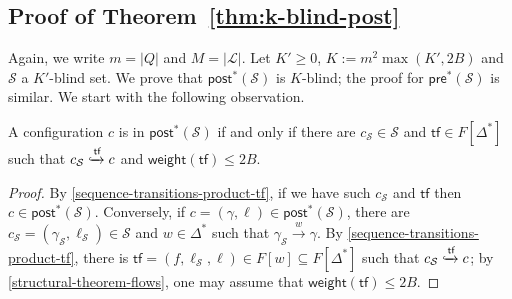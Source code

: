 \documentclass[10pt,a4paper]{article}
\renewcommand{\geq}{\geqslant}
\renewcommand{\leq}{\leqslant}
\newcommand{\deff}{:=}
\newcommand{\size}[1]{|#1|}
\newcommand{\config}{\gamma}
\newcommand{\preop}{\mathsf{pre}}
\newcommand{\postop}{\mathsf{post}}
\newcommand{\prestar}[1]{\preop^*(#1)}
\newcommand{\poststar}[1]{\postop^*(#1)}
\newcommand{\step}[1]{\xrightarrow{#1}}
\newcommand{\transitions}{\Delta}
\newcommand*{\states}{Q}
\newcommand{\cSet}{\mathcal{S}}  %
\newcommand{\bstates}{\mathcal{L}}
\newcommand*{\abuchistate}{\ell}
\newcommand*{\bstate}{\abuchistate}
\newcommand{\prodconfig}{c}
\newcommand*{\tfweight}[1]{\mathsf{weight}(#1)}
\newcommand*{\transfersof}[1]{F[#1]}
\newcommand*{\atf}{\mathsf{tf}}
\newcommand*{\flowstep}[1]{\xhookrightarrow{#1}}
\begin{document}
%
\subsection{Proof of Theorem~\ref{thm:k-blind-post}}

%
Again, we write \(m = \size{\states}\) and \(M = \size{\bstates}\).
Let \(K' \geq 0\), \(K \deff m^2 \max(K', 2 B)\) and \(\cSet\) a \(K'\)-blind set.
We prove that \(\poststar{\cSet}\) is \(K\)-blind; the proof for \(\prestar{\cSet}\) is similar.
We start with the following observation.

\begin{lemma}
	\label{poststar-chacterization}
	A configuration \(\prodconfig\) is in \(\poststar{\cSet}\) if and only if there are \(\prodconfig_\cSet \in \cSet\) and \(\atf \in \transfersof{\transitions^*}\) such that \(\prodconfig_\cSet \flowstep{\atf} \prodconfig\) and \(\tfweight{\atf} \leq 2B\).
\end{lemma}
\begin{proof}
	By \cref{sequence-transitions-product-tf}, if we have such \(\prodconfig_\cSet\) and \(\atf\) then \(\prodconfig \in \poststar{\cSet}\).
	Conversely, if \(\prodconfig = (\config,\bstate) \in \poststar{\cSet}\), there are \(\prodconfig_\cSet = (\config_\cSet, \bstate_\cSet) \in \cSet\) and \(w \in \transitions^*\) such that \(\config_\cSet \step{w} \config\).
	By \cref{sequence-transitions-product-tf}, there is \(\atf = (f, \bstate_\cSet, \bstate) \in \transfersof{w} \subseteq \transfersof{\transitions^*}\) such that \(\prodconfig_\cSet \flowstep{\atf} \prodconfig\); by \cref{structural-theorem-flows}, one may assume that \(\tfweight{\atf} \leq 2B\).
\end{proof}
\end{document}
